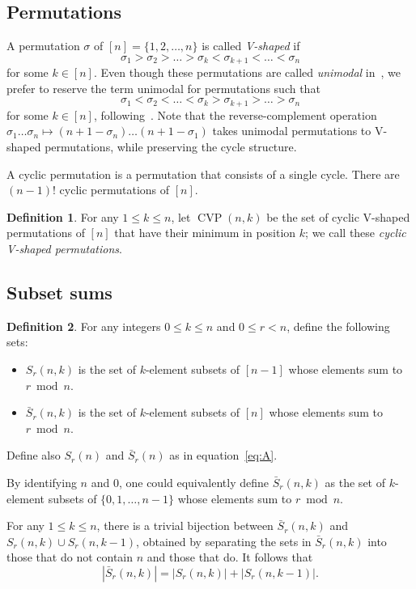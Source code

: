 \documentclass[12pt]{article}
\DeclareMathOperator{\CVP}{CVP}
\newcommand{\card}[1]{\left|#1\right|}
\newcommand{\bS}{\bar{S}}
\theoremstyle{definition}
\newtheorem{definition}{Definition}
\begin{document}
\subsection{Permutations}

A permutation $\sigma$ of $[n]=\{1,2,\dots,n\}$ is called {\em V-shaped} if $$\sigma_1>\sigma_2>\dots>\sigma_k<\sigma_{k+1}<\dots<\sigma_n$$ for some $k\in[n]$. Even though these permutations are called {\em unimodal} in~\cite{Baker}, we prefer to reserve the term unimodal for permutations such that $$\sigma_1<\sigma_2<\dots<\sigma_k>\sigma_{k+1}>\dots>\sigma_n$$ for some $k\in[n]$, following~\cite{Thibon,ArcEli}. Note that the reverse-complement operation $\sigma_1\dots\sigma_n\mapsto (n+1-\sigma_n)\dots(n+1-\sigma_1)$ takes unimodal permutations to V-shaped permutations, while preserving the cycle structure.

A cyclic permutation is a permutation that consists of a single cycle. There are $(n-1)!$ cyclic permutations of $[n]$.

\begin{definition}
    For any $1\le k\le n$, let $\CVP(n, k)$ be the set of cyclic V-shaped permutations of $[n]$ that have their minimum in position $k$; we call these {\em cyclic V-shaped permutations}.
\end{definition}


\subsection{Subset sums}
\begin{definition}
    For any integers $0\le k\le n$ and $0\le r< n$, define the following sets:
    \begin{itemize}
    \item $S_r(n, k)$ is the set of $k$-element subsets of $[n - 1]$ whose elements sum to $r \bmod n$.
    \item $\bS_r(n, k)$ is the set of $k$-element subsets of $[n]$ whose elements sum to $r \bmod n$.
    \end{itemize}
Define also $S_r(n)$ and $\bS_r(n)$ as in equation~\eqref{eq:A}.
\end{definition}

By identifying $n$ and $0$, one could equivalently define $\bS_r(n, k)$ as the set of $k$-element subsets of $\{0,1,\dots,n-1\}$ whose elements sum to $r \bmod n$.

For any $1\le k\le n$, there is a trivial bijection between $\bS_r(n,k)$ and $S_r(n,k)\cup S_r(n,k-1)$, obtained by separating the sets in $\bS_r(n,k)$ into those that do not contain $n$ and those that do. It follows that
\begin{equation}\label{eq:SS'}
\card{\bS_r(n,k)}=\card{S_r(n,k)}+\card{S_r(n,k-1)}.
\end{equation}
\end{document}
